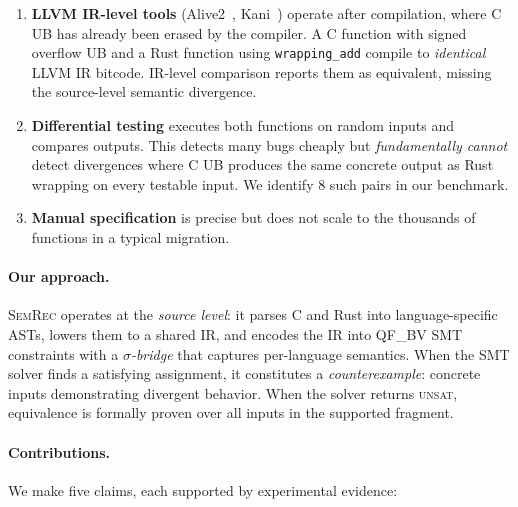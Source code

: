 \documentclass[11pt]{article}
\newcommand{\semrec}{\textsc{SemRec}}
\newcommand{\sigbridge}{$\sigma$-bridge}
\newcommand{\qfbv}{\textsf{QF\_BV}}
\newcommand{\UNSAT}{\textsc{unsat}}
\begin{document}
\begin{enumerate}[leftmargin=*,nosep]
\item \textbf{LLVM IR-level tools} (Alive2~\cite{alive2}, Kani~\cite{kani})
      operate after compilation, where C UB has already been erased by the
      compiler.  A C function with signed overflow UB and a Rust function
      using \texttt{wrapping\_add} compile to \emph{identical} LLVM IR
      bitcode.  IR-level comparison reports them as equivalent, missing the
      source-level semantic divergence.

\item \textbf{Differential testing} executes both functions on random inputs
      and compares outputs.  This detects many bugs cheaply but
      \emph{fundamentally cannot} detect divergences where C UB produces the
      same concrete output as Rust wrapping on every testable input.  We
      identify 8 such pairs in our benchmark.

\item \textbf{Manual specification} is precise but does not scale to the
      thousands of functions in a typical migration.
\end{enumerate}

\paragraph{Our approach.}
\semrec{} operates at the \emph{source level}: it parses C and Rust into
language-specific ASTs, lowers them to a shared IR, and encodes the IR into
\qfbv{} SMT constraints with a \emph{\sigbridge{}} that captures per-language
semantics.  When the SMT solver finds a satisfying assignment, it constitutes
a \emph{counterexample}: concrete inputs demonstrating divergent behavior.
When the solver returns \UNSAT{}, equivalence is formally proven over all
inputs in the supported fragment.

\paragraph{Contributions.}
We make five claims, each supported by experimental evidence:
\end{document}
